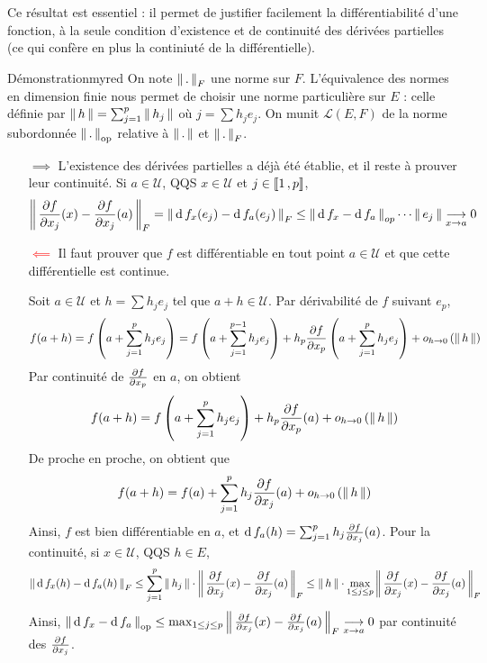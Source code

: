     Ce résultat est essentiel : il permet de justifier facilement la différentiabilité d’une fonction, à la seule condition d’existence et de continuité des dérivées partielles (ce qui confère en plus la continiuté de la différentielle). 

    \begin{demo}{Démonstration}{myred}
        On note $\left\lVert \,. \, \right\rVert_F$ une norme sur $F$. L’équivalence des normes en dimension finie nous permet de choisir une norme particulière sur $E$ : celle définie par $\left\lVert \,h \, \right\rVert = \sum_{j=1}^{p} \left\lVert \,h_j \, \right\rVert$ où $j = \sum h_j e_j$. On munit $\mathcal{L}(E,F)$ de la norme subordonnée $\left\lVert \,. \, \right\rVert_{\text{op}}$ relative à $\left\lVert \,. \, \right\rVert$ et $\left\lVert \,. \, \right\rVert_F$.
        \begin{itemize}
            \item[\textcolor{myred}{$\implies$}] L’existence des dérivées partielles a déjà été établie, et il reste à prouver leur continuité. Si $a \in \mathcal{U}$, QQS $x \in \mathcal{U}$ et $j \in \left\llbracket 1 \, , p \right\rrbracket$, 
            \[ \left\lVert \,\frac{\partial f}{\partial x_j}(x) - \frac{\partial f}{\partial x_j}(a) \, \right\rVert_F = \left\lVert \,\operatorname{d} f_x(e_j) - \operatorname{d} f_a(e_j) \, \right\rVert_F \leq \left\lVert \,\operatorname{d} f_x - \operatorname{d} f_a \, \right\rVert_{op} \cdots \left\lVert \,e_j \, \right\rVert \underset{x \rightarrow a}{\longrightarrow} 0 \]   
            \item[\textcolor{red}{$\impliedby$}] Il faut prouver que $f$ est différentiable en tout point $a \in \mathcal{U}$ et que cette différentielle est continue. 
            
            Soit $a \in \mathcal{U}$ et $h = \sum h_j e_j$ tel que $a + h \in \mathcal{U}$. Par dérivabilité de $f$ suivant $e_p$, 
            \[ f(a + h) = f \left(a + \sum_{j = 1}^p h_j e_j\right) = f \left(a + \sum_{j = 1}^{p-1} h_j e_j\right) + h_p \frac{\partial f}{\partial x_p}\left(a + \sum_{j = 1}^p h_j e_j\right) + o_{h \rightarrow 0} \left(\left\lVert \,h \, \right\rVert\right) \]   
            Par continuité de $\frac{\partial f}{\partial x_p}$ en $a$, on obtient 
            \[ f(a+h) = f\left(a + \sum_{j = 1}^p h_j e_j\right) + h_p \frac{\partial f}{\partial x_p}(a) + o_{h \rightarrow 0} \left(\left\lVert \,h \, \right\rVert\right) \]   
            De proche en proche, on obtient que 
            \[ f(a + h) = f(a) + \sum_{j=1}^{p} h_j \frac{\partial f}{\partial x_j} (a) + o_{h \rightarrow 0} \left(\left\lVert \,h \, \right\rVert\right) \]   
            Ainsi, $f$ est bien différentiable en $a$, et $\operatorname{d} f_a(h) = \sum_{j=1}^{p} h_j \frac{\partial f}{\partial x_j}(a)$. Pour la continuité, si $x \in \mathcal{U}$, QQS $h \in E$, 
            \[ \left\lVert \,\operatorname{d} f_x(h) - \operatorname{d} f_a(h) \, \right\rVert_F \leq \sum_{j=1}^{p}\left\lVert \,h_j \, \right\rVert\cdot \left\lVert \,\frac{\partial f}{\partial x_j}(x) - \frac{\partial f}{\partial x_j}(a) \, \right\rVert_F \leq \left\lVert \,h \, \right\rVert \cdot \max_{1\leq j \leq p} \left\lVert \,\frac{\partial f}{\partial x_j}(x) - \frac{\partial f}{\partial x_j}(a) \, \right\rVert_F \]   
            Ainsi, $\left\lVert \,\operatorname{d} f_x - \operatorname{d} f_a \, \right\rVert_{\text{op}} \leq \max_{1\leq j \leq p} \left\lVert \,\frac{\partial f}{\partial x_j}(x) - \frac{\partial f}{\partial x_j}(a) \, \right\rVert_F \underset{x \rightarrow a}{\longrightarrow} 0$ par continuité des $\frac{\partial f}{\partial x_j}$.
        \end{itemize}
    \end{demo}

